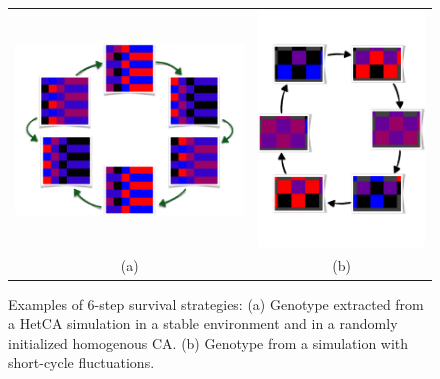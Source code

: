 \begin{figure}[h]
\centering
\begin{tabular}{cc}
\includegraphics[width=0.45\columnwidth]{img/4steptransition}& \includegraphics[width=0.45\columnwidth]{img/cyclesReal}\\
(a) & (b)
\end{tabular}
\caption{Examples of 6-step survival strategies: (a) Genotype extracted from a HetCA simulation in a stable environment and in a randomly initialized homogenous CA. (b) Genotype from a simulation with short-cycle fluctuations.}
\label{foursteps}
\end{figure}

